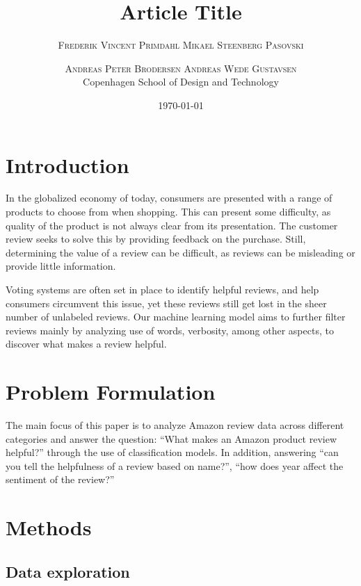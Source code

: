 \documentclass[twoside,twocolumn]{article}
\title{Article Title} %
\author{%
\textsc{Frederik Vincent Primdahl} \textsc{Mikael Steenberg Pasovski} \and \textsc{Andreas Peter Brodersen} \textsc{Andreas Wede Gustavsen} \\[1ex] %
\normalsize Copenhagen School of Design and Technology \\ %
}
\date{\today} %
\begin{document}
\maketitle


\section{Introduction}
In the globalized economy of today, consumers are presented with a range of products to choose from when shopping. This can present some difficulty, as quality of the product is not always clear from its presentation. The customer review seeks to solve this by providing feedback on the purchase. Still, determining the value of a review can be difficult, as reviews can be misleading or provide little information.

Voting systems are often set in place to identify helpful reviews, and help consumers circumvent this issue, yet these reviews still get lost in the sheer number of unlabeled reviews. Our machine learning model aims to further filter reviews mainly by analyzing use of words, verbosity, among other aspects, to discover what makes a review helpful.

\section{Problem Formulation}

The main focus of this paper is to analyze Amazon review data across different categories and answer the question: “What makes an Amazon product review helpful?” through the use of classification models. In addition, answering “can you tell the helpfulness of a review based on name?”, “how does year affect the sentiment of the review?”

\section{Methods}

\subsection{Data exploration}
\end{document}
